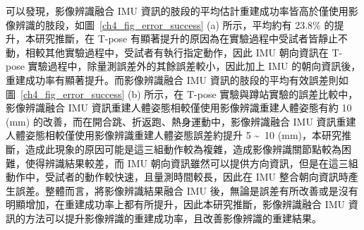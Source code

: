 可以發現，影像辨識融合 IMU 資訊的肢段的平均估計重建成功率皆高於僅使用影像辨識的肢段，如圖~\ref{ch4_fig_error_success} (a) 所示，平均約有 23.8\% 的提升，本研究推斷，在 T-pose 有顯著提升的原因為在實驗過程中受試者皆靜止不動，相較其他實驗過程中，受試者有執行指定動作，因此 IMU 朝向資訊在 T-pose 實驗過程中，除量測誤差外的其餘誤差較小，因此加上 IMU 的朝向資訊後，重建成功率有顯著提升。而影像辨識融合 IMU 資訊的肢段的平均有效誤差則如圖~\ref{ch4_fig_error_success} (b) 所示，在 T-pose 實驗與蹲站實驗的誤差比較中，影像辨識融合 IMU 資訊重建人體姿態相較僅使用影像辨識重建人體姿態有約 10 (mm) 的改善，而在開合跳、折返跑、熱身運動中，影像辨識融合 IMU 資訊重建人體姿態相較僅使用影像辨識重建人體姿態誤差約提升 5 \textasciitilde\ 10 (mm)，本研究推斷，造成此現象的原因可能是這三組動作較為複雜，造成影像辨識關節點較為困難，使得辨識結果較差，而 IMU 朝向資訊雖然可以提供方向資訊，但是在這三組動作中，受試者的動作較快速，且量測時間較長，因此在 IMU 整合朝向資訊時產生誤差。整體而言，將影像辨識結果融合 IMU 後，無論是誤差有所改善或是沒有明顯增加，在重建成功率上都有所提升，因此本研究推斷，影像辨識融合 IMU 資訊的方法可以提升影像辨識的重建成功率，且改善影像辨識的重建結果。

